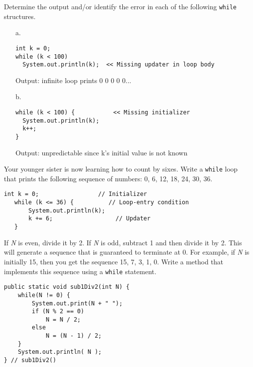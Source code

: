 \begin{ANS}
\item  Determine the output and/or identify the error in each of the following
{\tt while} structures.
\begin{enumerate}

\item[a.]

\begin{jjjlisting}
\begin{lstlisting}[basicstyle=\scriptsize]
int k = 0;
while (k < 100)
  System.out.println(k);  << Missing updater in loop body
\end{lstlisting}
\end{jjjlisting}
Output: infinite loop prints 0 0 0 0 0...


\item[b.]

\begin{jjjlisting}
\begin{lstlisting}[basicstyle=\scriptsize]
while (k < 100) {           << Missing initializer
  System.out.println(k);
  k++;
}
\end{lstlisting}
\end{jjjlisting}
Output: unpredictable since k's initial value is not known

\end{enumerate}


\item  Your younger sister is now learning how to count by sixes.
Write a {\tt while} loop that prints the following sequence of numbers: 0,
6, 12, 18, 24, 30, 36.

\begin{jjjlisting}
\begin{lstlisting}[basicstyle=\scriptsize]
   int k = 0;                 // Initializer
   while (k <= 36) {          // Loop-entry condition
       System.out.println(k);
       k += 6;                  // Updater
   }
\end{lstlisting}
\end{jjjlisting}


\item  If {\it N} is even, divide it by 2. If {\it N} is odd, subtract 1 and
then divide it by 2. This will generate a sequence that is guaranteed
to terminate at 0.  For example, if {\it N} is initially 15, then you
get the sequence 15, 7, 3, 1, 0. Write a method that implements this
sequence using a {\tt while} statement.

\begin{jjjlisting}
\begin{lstlisting}[basicstyle=\scriptsize]
public static void sub1Div2(int N) {
    while(N != 0) {
        System.out.print(N + " ");
        if (N % 2 == 0)
            N = N / 2;
        else
            N = (N - 1) / 2;
    }
    System.out.println( N );
} // sub1Div2()
\end{lstlisting}
\end{jjjlisting}


\end{ANS}

